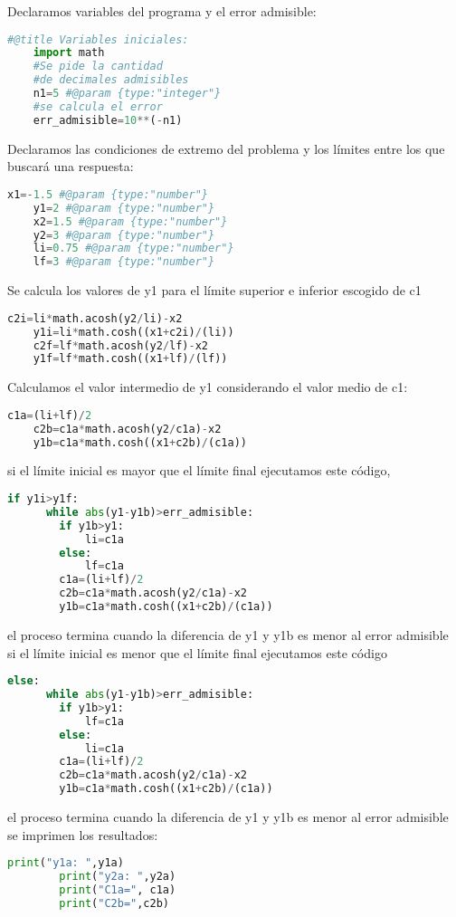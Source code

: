 Declaramos variables del programa y el error admisible:
\begin{lstlisting}[language=Python]
    #@title Variables iniciales:
    import math
    #Se pide la cantidad 
    #de decimales admisibles
    n1=5 #@param {type:"integer"}
    #se calcula el error
    err_admisible=10**(-n1)
\end{lstlisting}
\framebreak
Declaramos las condiciones de extremo del problema y los límites entre los que buscará una respuesta:
\begin{lstlisting}[language=Python]
    x1=-1.5 #@param {type:"number"}
    y1=2 #@param {type:"number"}
    x2=1.5 #@param {type:"number"}
    y2=3 #@param {type:"number"}
    li=0.75 #@param {type:"number"}
    lf=3 #@param {type:"number"}
\end{lstlisting}
\framebreak
Se calcula los valores de y1 para el límite superior e inferior escogido de c1
\begin{lstlisting}[language=Python]
    c2i=li*math.acosh(y2/li)-x2
    y1i=li*math.cosh((x1+c2i)/(li))
    c2f=lf*math.acosh(y2/lf)-x2
    y1f=lf*math.cosh((x1+lf)/(lf))
\end{lstlisting}
\framebreak

Calculamos el valor intermedio de y1 considerando el valor medio de c1:
\begin{lstlisting}[language=Python]    
    c1a=(li+lf)/2
    c2b=c1a*math.acosh(y2/c1a)-x2
    y1b=c1a*math.cosh((x1+c2b)/(c1a))
\end{lstlisting}
\framebreak
si el límite inicial es mayor que el límite final ejecutamos este código,
\begin{lstlisting}[language=Python]         
    if y1i>y1f:
      while abs(y1-y1b)>err_admisible:
        if y1b>y1:
            li=c1a
        else:
            lf=c1a
        c1a=(li+lf)/2
        c2b=c1a*math.acosh(y2/c1a)-x2
        y1b=c1a*math.cosh((x1+c2b)/(c1a))
\end{lstlisting}
el proceso termina cuando la diferencia de y1 y y1b es menor al error admisible\\
\framebreak
si el límite inicial es menor que el límite final ejecutamos este código
\begin{lstlisting}[language=Python]             
    else:
      while abs(y1-y1b)>err_admisible:
        if y1b>y1:
            lf=c1a
        else:
            li=c1a
        c1a=(li+lf)/2
        c2b=c1a*math.acosh(y2/c1a)-x2
        y1b=c1a*math.cosh((x1+c2b)/(c1a))
\end{lstlisting}
el proceso termina cuando la diferencia de y1 y y1b es menor al error admisible\\
\framebreak
se imprimen los resultados:
\begin{lstlisting}[language=Python]   
        print("y1a: ",y1a)
        print("y2a: ",y2a)
        print("C1a=", c1a)
        print("C2b=",c2b)
\end{lstlisting}
